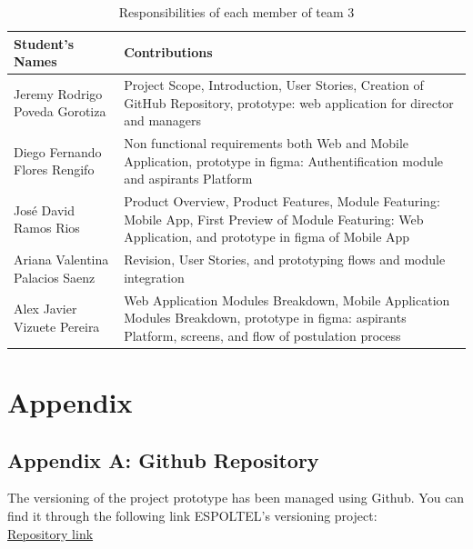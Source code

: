 \documentclass{scrreprt}
\begin{document}
\begin{table}[h!]
    \centering \small
    \renewcommand{\arraystretch}{1.5} %
    \begin{tabular}{|p{5cm}|p{10cm}|} %
    \hline
    \textbf{Student's Names} & \textbf{Contributions} \\ \hline
    Jeremy Rodrigo Poveda Gorotiza & Project Scope, Introduction, User Stories, Creation of GitHub Repository, prototype: web application for director and managers \\ \hline
    Diego Fernando Flores Rengifo & Non functional requirements both Web and Mobile Application, prototype in figma: Authentification module and aspirants Platform  \\ \hline
    José David Ramos Rios & Product Overview, Product Features, Module Featuring: Mobile App, First Preview of Module Featuring: Web Application, and prototype in figma of Mobile App \\ \hline
    Ariana Valentina Palacios Saenz & Revision, User Stories, and prototyping flows and module integration\\ \hline
    Alex Javier Vizuete Pereira & Web Application Modules Breakdown, Mobile Application Modules Breakdown, prototype in figma: aspirants Platform, screens, and flow of postulation process\\ \hline
    \end{tabular}
    \caption{Responsibilities of each member of team 3}
\end{table} \FloatBarrier 



\chapter{Appendix}

\section{Appendix A: Github Repository}
The versioning of the project prototype has been managed using Github. You can find it through the following link ESPOLTEL's versioning project:\\ \href{https://github.com/Jeremy-Poveda/EspoltelHiringManager}{Repository link}
\end{document}
